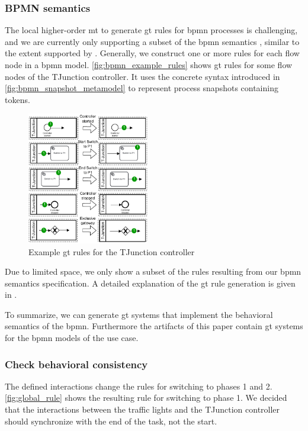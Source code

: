 \documentclass{jot}
\begin{document}
\subsubsection{BPMN semantics}
The local higher-order \gls*{mt} to generate \gls*{gt} rules for \gls*{bpmn} processes is challenging, and we are currently only supporting a subset of the \gls*{bpmn} semantics \cite{krauterFormalizationAnalysisBPMN2022}, similar to the extent supported by \cite{vangorpVisualTokenbasedFormalization2013}.
Generally, we construct one or more rules for each flow node in a \gls*{bpmn} model.
\autoref{fig:bpmn_example_rules} shows \gls*{gt} rules for some flow nodes of the TJunction controller.
It uses the concrete syntax introduced in \cref{fig:bpmn_snapshot_metamodel} to represent process snapshots containing tokens.

\begin{figure}[h]
    \centering
    \includegraphics[width=0.475\textwidth]{figures/bpmn_rules.pdf}
    \caption{Example \gls*{gt} rules for the TJunction controller}
    \label{fig:bpmn_example_rules}
\end{figure}

Due to limited space, we only show a subset of the rules resulting from our \gls*{bpmn} semantics specification.
A detailed explanation of the \gls*{gt} rule generation is given in \cite{krauterFormalizationAnalysisBPMN2022}.

To summarize, we can generate \gls*{gt} systems that implement the behavioral semantics of the \gls*{bpmn}.
Furthermore the artifacts of this paper \cite{krauterArtifactsBehavioralConsistency2022} contain \gls*{gt} systems for the \gls*{bpmn} models of the use case.


\subsubsection{Check behavioral consistency}
The defined interactions change the rules for switching to phases 1 and 2.
\autoref{fig:global_rule} shows the resulting rule for switching to phase 1.
We decided that the interactions between the traffic lights and the TJunction controller should synchronize with the end of the task, not the start.
\end{document}
